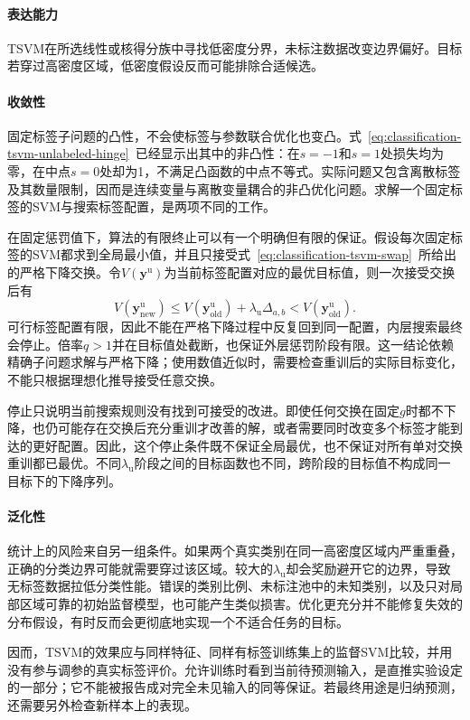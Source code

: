 \paragraph{表达能力}
TSVM在所选线性或核得分族中寻找低密度分界，未标注数据改变边界偏好。目标若穿过高密度区域，低密度假设反而可能排除合适候选。

\paragraph{收敛性}
固定标签子问题的凸性，不会使标签与参数联合优化也变凸。式~\eqref{eq:classification-tsvm-unlabeled-hinge}~已经显示出其中的非凸性：在$s=-1$和$s=1$处损失均为零，在中点$s=0$处却为1，不满足凸函数的中点不等式。实际问题又包含离散标签及其数量限制，因而是连续变量与离散变量耦合的非凸优化问题。求解一个固定标签的SVM与搜索标签配置，是两项不同的工作。

在固定惩罚值下，算法的有限终止可以有一个明确但有限的保证。假设每次固定标签的SVM都求到全局最小值，并且只接受式~\eqref{eq:classification-tsvm-swap}~所给出的严格下降交换。令$V(\bm{y}^{\mathrm{u}})$为当前标签配置对应的最优目标值，则一次接受交换后有
\[
  V(\bm{y}_{\mathrm{new}}^{\mathrm{u}})
    \leq V(\bm{y}_{\mathrm{old}}^{\mathrm{u}})
      +\lambda_{\mathrm{u}}\Delta_{a,b}
    <V(\bm{y}_{\mathrm{old}}^{\mathrm{u}}).
\]
可行标签配置有限，因此不能在严格下降过程中反复回到同一配置，内层搜索最终会停止。倍率$q>1$并在目标值处截断，也保证外层惩罚阶段有限。这一结论依赖精确子问题求解与严格下降；使用数值近似时，需要检查重训后的实际目标变化，不能只根据理想化推导接受任意交换。

停止只说明当前搜索规则没有找到可接受的改进。即使任何交换在固定$g$时都不下降，也仍可能存在交换后充分重训才改善的解，或者需要同时改变多个标签才能到达的更好配置。因此，这个停止条件既不保证全局最优，也不保证对所有单对交换重训都已最优。不同$\lambda_{\mathrm{u}}$阶段之间的目标函数也不同，跨阶段的目标值不构成同一目标下的下降序列。

\paragraph{泛化性}
统计上的风险来自另一组条件。如果两个真实类别在同一高密度区域内严重重叠，正确的分类边界可能就需要穿过该区域。较大的$\lambda_{\mathrm{u}}$却会奖励避开它的边界，导致无标签数据拉低分类性能。错误的类别比例、未标注池中的未知类别，以及只对局部区域可靠的初始监督模型，也可能产生类似损害。优化更充分并不能修复失效的分布假设，有时反而会更彻底地实现一个不适合任务的目标。

因而，TSVM的效果应与同样特征、同样有标签训练集上的监督SVM比较，并用没有参与调参的真实标签评价。允许训练时看到当前待预测输入，是直推实验设定的一部分；它不能被报告成对完全未见输入的同等保证。若最终用途是归纳预测，还需要另外检查新样本上的表现。

